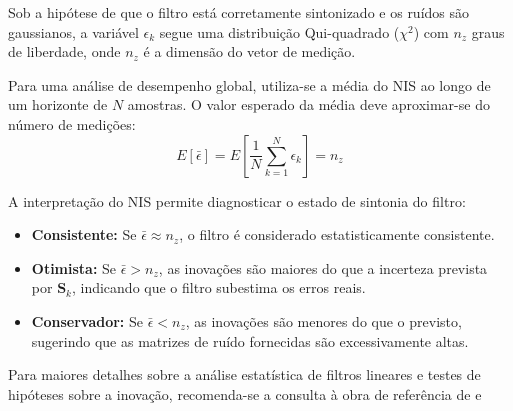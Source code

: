 \documentclass[journal]{IEEEtran}
\begin{document}
\begin{appendices}
\label{app:ChiChen}

Sob a hipótese de que o filtro está corretamente sintonizado e os ruídos são gaussianos, a variável $\epsilon_k$ segue uma distribuição Qui-quadrado ($\chi^2$) com $n_z$ graus de liberdade, onde $n_z$ é a dimensão do vetor de medição. 

Para uma análise de desempenho global, utiliza-se a média do NIS ao longo de um horizonte de $N$ amostras. O valor esperado da média deve aproximar-se do número de medições:
\begin{equation}
    \label{eq:media_nis}
    E[\bar{\epsilon}] = E \left[ \frac{1}{N} \sum_{k=1}^{N} \epsilon_k \right] = n_z
\end{equation}

A interpretação do NIS permite diagnosticar o estado de sintonia do filtro:
\begin{itemize}
    \item \textbf{Consistente:} Se $\bar{\epsilon} \approx n_z$, o filtro é considerado estatisticamente consistente.
    \item \textbf{Otimista:} Se $\bar{\epsilon} > n_z$, as inovações são maiores do que a incerteza prevista por $\mathbf{S}_k$, indicando que o filtro subestima os erros reais.
    \item \textbf{Conservador:} Se $\bar{\epsilon} < n_z$, as inovações são menores do que o previsto, sugerindo que as matrizes de ruído fornecidas são excessivamente altas.
\end{itemize}

Para maiores detalhes sobre a análise estatística de filtros lineares e testes de hipóteses sobre a inovação, recomenda-se a consulta à obra de referência de \cite{BarShalom2001} e \cite{chen2023kalman}


\end{appendices}
\end{document}
